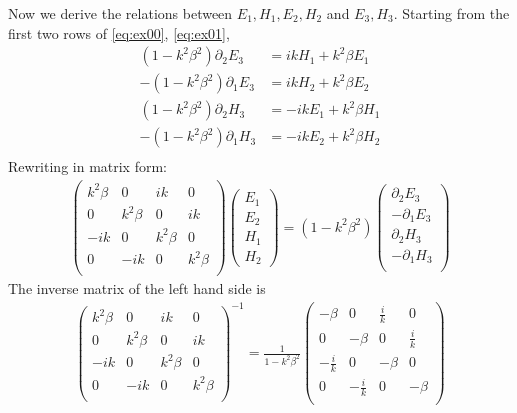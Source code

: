 Now we derive the relations between $E_1, H_1, E_2, H_2$ and $E_3, H_3$. Starting from the first two rows of \eqref{eq:ex00}, \eqref{eq:ex01},  
\begin{align*}
  \left(1-k^2\beta^2\right)\partial_2 E_3 &= ik H_1 + k^2\beta E_1 \\
  -\left(1-k^2\beta^2\right)\partial_1 E_3 &= ik H_2 + k^2\beta E_2 \\
  \left(1-k^2\beta^2\right)\partial_2 H_3 &= -ik E_1 + k^2\beta H_1 \\
  -\left(1-k^2\beta^2\right)\partial_1 H_3 &= -ik E_2 + k^2\beta H_2 \\
\end{align*}
Rewriting in matrix form:
\begin{align*}
  \begin{pmatrix}
    k^2\beta & 0 & ik & 0 \\
    0 & k^2\beta & 0 & ik \\
    -ik & 0 & k^2\beta & 0 \\
    0 & -ik & 0 & k^2\beta \\
  \end{pmatrix} 
  \begin{pmatrix}
    E_1 \\ E_2 \\ H_1 \\ H_2
  \end{pmatrix} =
  \left(1-k^2\beta^2\right)
  \begin{pmatrix}
    \partial_2 E_3 \\ -\partial_1 E_3 \\ \partial_2 H_3 \\ -\partial_1 H_3 \\ 
  \end{pmatrix}
\end{align*}
The inverse matrix of the left hand side is
\begin{align*}
  \begin{pmatrix}
    k^2\beta & 0 & ik & 0 \\
    0 & k^2\beta & 0 & ik \\
    -ik & 0 & k^2\beta & 0 \\
    0 & -ik & 0 & k^2\beta \\
  \end{pmatrix}^{-1} = \frac{1}{1-k^2\beta^2}
  \begin{pmatrix}
    -\beta & 0 & \frac{i}{k} & 0 \\
    0 & -\beta & 0 & \frac{i}{k} \\
    -\frac{i}{k} & 0 & -\beta & 0 \\
    0 & -\frac{i}{k} & 0 & -\beta \\
  \end{pmatrix} 
\end{align*}
